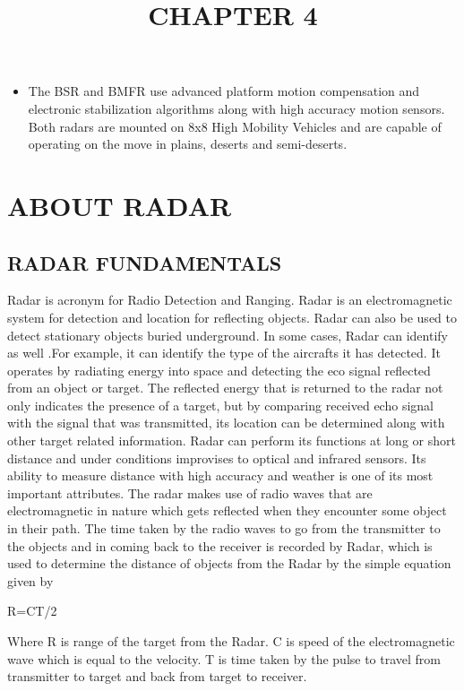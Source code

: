 \documentclass[14pt]{article} %
\begin{document}
\begin{itemize}
\item The BSR and BMFR use advanced platform motion compensation and electronic stabilization algorithms along with high accuracy motion sensors. Both radars are mounted on 8x8 High Mobility Vehicles and are capable of operating on the move in plains, deserts and semi-deserts.
\end{itemize}

\title{\textbf{\huge {CHAPTER 4}}}
\maketitle
\section {ABOUT RADAR}

\subsection{RADAR FUNDAMENTALS}
Radar is acronym for Radio Detection and Ranging. Radar is an electromagnetic system for detection and location for reflecting objects. Radar can also be used to detect stationary objects buried underground. In some cases, Radar can identify as well .For example, it can identify the type of the aircrafts it has detected. It operates by radiating energy into space and detecting the eco signal reflected from an object or target. The reflected energy that is returned to the radar not only indicates the presence of a target, but by comparing received echo signal with the signal that was transmitted, its location can be determined along with other target related information. Radar can perform its functions at long or short distance and  under conditions improvises to optical and infrared sensors. Its ability to measure distance with high accuracy and weather is one of its most important attributes. The radar makes use of radio waves that are electromagnetic in nature which gets reflected when they encounter some object in their path. 
The time taken by the radio waves to go from the transmitter to the objects and in coming back to the receiver is recorded by Radar, which is used to determine the distance of objects from the Radar by the simple equation given by
 \begin{center}                                             
    R=CT/2
 \end{center}
Where R is range of the target from the Radar.
 C is speed of the electromagnetic wave which is equal to the velocity.
 T is time taken by the pulse to travel from transmitter to target and back from target to receiver.
\end{document}

